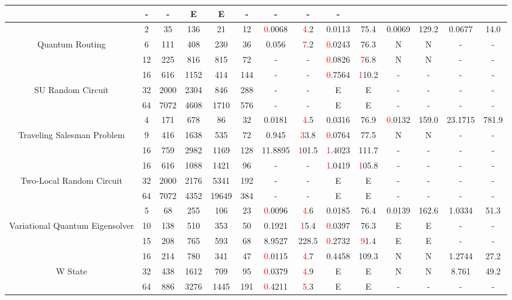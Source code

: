 \begin{table}[htb]
{\begin{tabular}{|c|c|c|c|c|c|c|c|c|c|c|c|c|c|}
 & - & -
 & E & E
 & - & -
 & - & -
 \\
\hline
 & 
2 & 35 & 136 & 21 & 12
 & \textcolor{red}0.0068 & \textcolor{red}4.2
 & 0.0113 & 75.4
 & 0.0069 & 129.2
 & 0.0677 & 14.0
 \\
Quantum Routing & 
6 & 111 & 408 & 230 & 36
 & 0.056 & \textcolor{red}7.2
 & \textcolor{red}0.0243 & 76.3
 & N & N 
 & - & -
 \\
 & 
12 & 225 & 816 & 815 & 72
 & - & -
 & \textcolor{red}0.0826 & \textcolor{red}76.8
 & N & N 
 & - & -
 \\
\hline
 & 
16 & 616 & 1152 & 414 & 144
 & - & -
 & \textcolor{red}0.7564 & \textcolor{red}110.2
 & - & -
 & - & -
 \\
SU Random Circuit & 
32 & 2000 & 2304 & 846 & 288
 & - & -
 & E & E
 & - & -
 & - & -
 \\
 & 
64 & 7072 & 4608 & 1710 & 576
 & - & -
 & E & E
 & - & -
 & - & -
 \\
\hline
 & 
4 & 171 & 678 & 86 & 32
 & 0.0181 & \textcolor{red}4.5
 & 0.0316 & 76.9
 & \textcolor{red}0.0132 & 159.0
 & 23.1715 & 781.9
 \\
Traveling Salesman Problem & 
9 & 416 & 1638 & 535 & 72
 & 0.945 & \textcolor{red}33.8
 & \textcolor{red}0.0764 & 77.5
 & N & N 
 & - & -
 \\
 & 
16 & 759 & 2982 & 1169 & 128
 & 11.8895 & \textcolor{red}101.5
 & \textcolor{red}1.4023 & 111.7
 & - & -
 & - & -
 \\
\hline
 & 
16 & 616 & 1088 & 1421 & 96
 & - & -
 & \textcolor{red}1.0419 & \textcolor{red}105.8
 & - & -
 & - & -
 \\
Two-Local Random Circuit & 
32 & 2000 & 2176 & 5341 & 192
 & - & -
 & E & E
 & - & -
 & - & -
 \\
 & 
64 & 7072 & 4352 & 19649 & 384
 & - & -
 & E & E
 & - & -
 & - & -
 \\
\hline
 & 
5 & 68 & 255 & 106 & 23
 & \textcolor{red}0.0096 & \textcolor{red}4.6
 & 0.0185 & 76.4
 & 0.0139 & 162.6
 & 1.0334 & 51.3
 \\
Variational Quantum Eigensolver & 
10 & 138 & 510 & 353 & 50
 & 0.1921 & \textcolor{red}15.4
 & \textcolor{red}0.0397 & 76.3
 & E & E
 & - & -
 \\
 & 
15 & 208 & 765 & 593 & 68
 & 8.9527 & 228.5
 & \textcolor{red}0.2732 & \textcolor{red}91.4
 & E & E
 & - & -
 \\
\hline
 & 
16 & 214 & 780 & 341 & 47
 & \textcolor{red}0.0115 & \textcolor{red}4.7
 & 0.4458 & 109.3
 & N & N 
 & 1.2744 & 27.2
 \\
W State & 
32 & 438 & 1612 & 709 & 95
 & \textcolor{red}0.0379 & \textcolor{red}4.9
 & E & E
 & N & N 
 & 8.761 & 49.2
 \\
 & 
64 & 886 & 3276 & 1445 & 191
 & \textcolor{red}0.4211 & \textcolor{red}5.3
 & E & E
 & - & -
 & - & -
 \\
\hline
\end{tabular}}
\end{table}